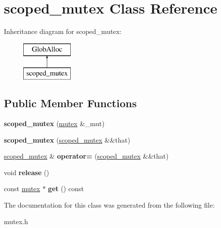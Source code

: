 \hypertarget{classscoped__mutex}{\section{scoped\-\_\-mutex Class Reference}
\label{classscoped__mutex}
}
Inheritance diagram for scoped\-\_\-mutex\-:\begin{figure}[H]
\begin{center}
\leavevmode
\includegraphics[height=2.000000cm]{classscoped__mutex}
\end{center}
\end{figure}
\subsection*{Public Member Functions}
\begin{DoxyCompactItemize}
\item 
\hypertarget{classscoped__mutex_a696f6dd538fcbd364211d70f9efcaf44}{{\bfseries scoped\-\_\-mutex} (\hyperlink{classmutex}{mutex} \&\-\_\-mut)}\label{classscoped__mutex_a696f6dd538fcbd364211d70f9efcaf44}

\item 
\hypertarget{classscoped__mutex_afb0edb1fb3877d36fd30555d653a0113}{{\bfseries scoped\-\_\-mutex} (\hyperlink{classscoped__mutex}{scoped\-\_\-mutex} \&\&that)}\label{classscoped__mutex_afb0edb1fb3877d36fd30555d653a0113}

\item 
\hypertarget{classscoped__mutex_a0665a61f38e54efadf756abf92ed8360}{\hyperlink{classscoped__mutex}{scoped\-\_\-mutex} \& {\bfseries operator=} (\hyperlink{classscoped__mutex}{scoped\-\_\-mutex} \&\&that)}\label{classscoped__mutex_a0665a61f38e54efadf756abf92ed8360}

\item 
\hypertarget{classscoped__mutex_a07e9a187027c97839b139856605f7e13}{void {\bfseries release} ()}\label{classscoped__mutex_a07e9a187027c97839b139856605f7e13}

\item 
\hypertarget{classscoped__mutex_ae07654bdda62a614d199fc027901da03}{const \hyperlink{classmutex}{mutex} $\ast$ {\bfseries get} () const }\label{classscoped__mutex_ae07654bdda62a614d199fc027901da03}

\end{DoxyCompactItemize}


The documentation for this class was generated from the following file\-:\begin{DoxyCompactItemize}
\item 
mutex.\-h\end{DoxyCompactItemize}
